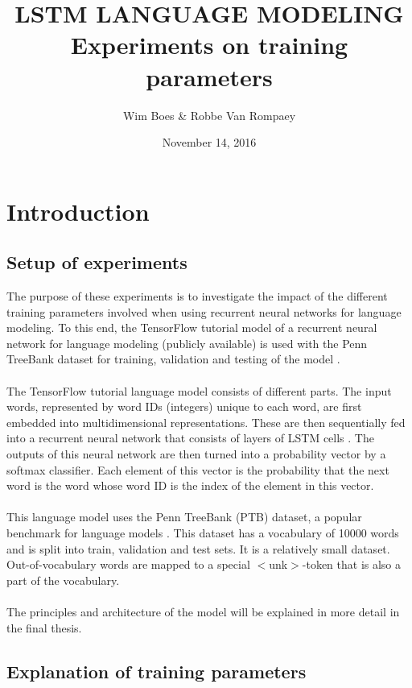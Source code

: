 \documentclass[10pt,a4paper,titlepage]{article}
\author{Wim Boes \& Robbe Van Rompaey}
\title{LSTM LANGUAGE MODELING\\Experiments on training parameters}
\date{November 14, 2016}
\begin{document}
\maketitle	

\setcounter{tocdepth}{2}
\tableofcontents

\newpage

\section{Introduction}

\subsection{Setup of experiments}
\label{sec:setup}

The purpose of these experiments is to investigate the impact of the different training parameters involved when using recurrent neural networks for language modeling. To this end, the TensorFlow tutorial model of a recurrent neural network for language modeling (publicly available) is used with the Penn TreeBank dataset for training, validation and testing of the model \cite{tensorflow}.\\
\\
The TensorFlow tutorial language model consists of different parts. The input words, represented by word IDs (integers) unique to each word, are first embedded into multidimensional representations. These are then sequentially fed into a recurrent neural network that consists of layers of LSTM cells \cite{LSTM}. The outputs of this neural network are then turned into a probability vector by a softmax classifier. Each element of this vector is the probability that the next word is the word whose word ID is the index of the element in this vector.\\
\\
This language model uses the Penn TreeBank (PTB) dataset, a popular benchmark for language models \cite{PTB}. This dataset has a vocabulary of 10000 words and is split into train, validation and test sets. It is a relatively small dataset. Out-of-vocabulary words are mapped to a special $<$unk$>$-token that is also a part of the vocabulary.\\
\\
The principles and architecture of the model will be explained in more detail in the final thesis.

\subsection{Explanation of training parameters}
\label{subsec:exp}
\end{document}
